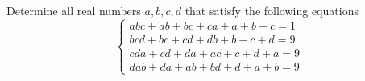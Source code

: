 Determine all real numbers $a,b,c,d$ that satisfy the following equations\[\begin{cases} abc + ab + bc + ca + a + b + c = 1\\  bcd + bc + cd + db + b + c + d = 9\\ cda + cd + da + ac + c + d + a = 9\\  dab + da + ab + bd + d + a + b = 9\end{cases}\]